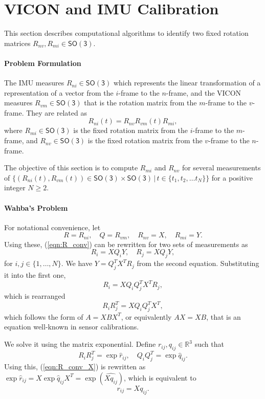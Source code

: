 \documentclass[11pt]{article}
\newcommand{\SO}{\ensuremath{\mathsf{SO(3)}}}
\renewcommand{\Re}{\ensuremath{\mathbb{R}}}
\newcommand{\refeqn}[1]{(\ref{eqn:#1})}
\begin{document}
\section{VICON and IMU Calibration}\label{sec:Calib}

This section describes computational algorithms to identify two fixed rotation matrices $R_{nv},R_{mi}\in\SO$. 

\paragraph{Problem Formulation} 

The IMU measures $R_{ni}\in\SO$ which represents the linear transformation of a representation of a vector from the $i$-frame to the $n$-frame, and the VICON measures $R_{vm}\in\SO$ that is the rotation matrix from the $m$-frame to the $v$-frame. They are related as
\begin{equation}\label{eqn:R_conv}
R_{ni}(t) =  R_{nv} R_{vm}(t) R_{mi},
\end{equation}
where $R_{mi}\in\SO$ is the fixed rotation matrix from the $i$-frame to the $m$-frame, and $R_{nv}\in\SO$ is the fixed rotation matrix from the $v$-frame to the $n$-frame.

The objective of this section is to compute $R_{mi}$ and $R_{nv}$ for several measurements of $\{(R_{ni}(t),R_{vm}(t))\in\SO\times\SO\,|\, t\in\{t_1,t_2,\ldots t_N\}\}$ for a positive integer $N\geq 2$.

\paragraph{Wahba's Problem}
For notational convenience, let
\[
R=R_{ni},\quad Q=R_{vm},\quad R_{nv}=X,\quad R_{mi}=Y.
\]
Using these, \refeqn{R_conv} can be rewritten for two sets of measurements as 
\[
R_i = X Q_i Y,\quad R_j = X Q_j Y,
\]
for $i,j\in\{1,\ldots,N\}$. We have $Y= Q_j^T X^T R_j$ from the second equation. Substituting it into the first one,
\[
R_i = X Q_i Q_j^T X^T R_j,
\]
which is rearranged 
\begin{equation}\label{eqn:R_conv_X}
R_i R_j^T = X Q_i Q_j^T X^T,
\end{equation}
which follows the form of $A=XBX^T$, or equivalently $AX=XB$, that is an equation well-known in sensor calibrations. 

We solve it using the matrix exponential. Define $r_{ij},q_{ij}\in\Re^3$ such that
\begin{equation}\label{eqn:rq}
R_i R_j^T = \exp\hat r_{ij},\quad Q_iQ_j^T = \exp \hat q_{ij}.
\end{equation}
Using this, \refeqn{R_conv_X} is rewritten as $\exp\hat r_{ij} = X \exp\hat q_{ij} X^T =\exp(\widehat{Xq_{ij}})$, which is equivalent to
\begin{equation}\label{eqn:r_conv}
r_{ij} = X q_{ij}. 
\end{equation}
\end{document}
